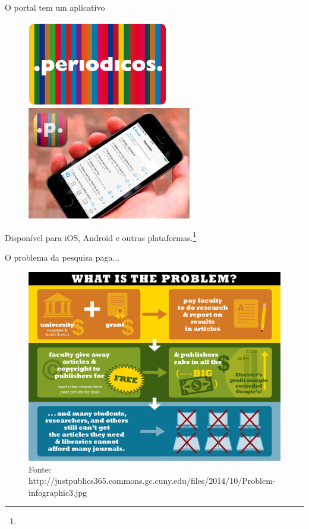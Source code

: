 \begin{frame}{O portal tem um aplicativo}
\begin{figure}
\includegraphics[scale=0.4]{figs/04/periodicos}
\quad
\includegraphics[scale=0.45]{figs/04/app}
\end{figure}

Disponível para iOS, Android e outras plataformas.\footnote{}
\end{frame}

\begin{frame}{O problema da pesquisa paga...}
\begin{figure}
\centering
\includegraphics[scale=0.3]{figs/04/problem}
\caption{\scriptsize{Fonte: http://justpublics365.commons.gc.cuny.edu/files/2014/10/Problem-infographic3.jpg}}
\end{figure}
\end{frame}

